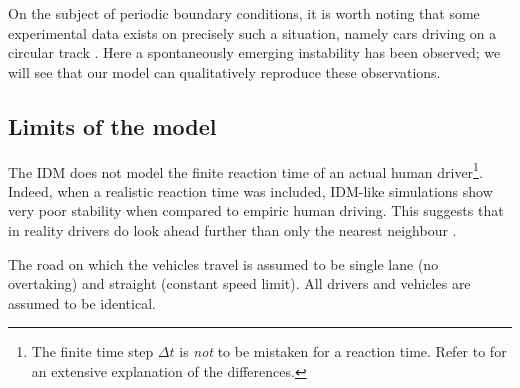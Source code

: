 On the subject of periodic boundary conditions, it is worth noting that some experimental data exists on precisely such a situation, namely cars driving on a circular track \cite{nakayama2009,tadaki2013}. Here a spontaneously emerging instability has been observed; we will see that our model can qualitatively reproduce these observations.


\subsection{Limits of the model}
The IDM does not model the finite reaction time of an actual human driver\footnote{The finite time step $\Delta t$ is \emph{not} to be mistaken for a reaction time. Refer to \cite{treiber2006} for an extensive explanation of the differences.}. Indeed, when a realistic reaction time was included, IDM-like simulations show very poor stability when compared to empiric human driving. This suggests that in reality drivers do look ahead further than only the nearest neighbour \cite{treiber2006}.

The road on which the vehicles travel is assumed to be single lane (no overtaking) and straight (constant speed limit). All drivers and vehicles are assumed to be identical.


